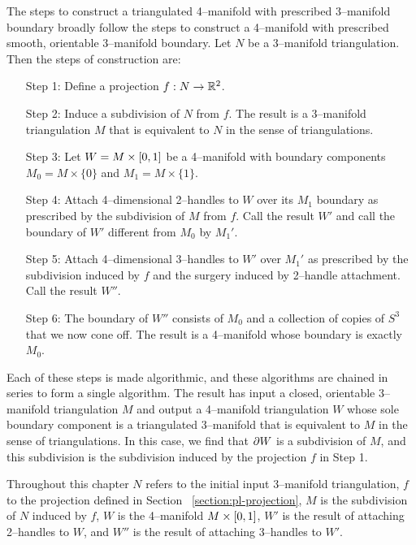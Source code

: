 \label{chapter:triangulation}

The steps to construct a triangulated 4--manifold with prescribed 3--manifold boundary broadly follow the steps to construct a 4--manifold with prescribed smooth, orientable 3--manifold boundary.
Let $N$ be a 3--manifold triangulation.
Then the steps of construction are:
\begin{enumerate}
	\item[Step 1:] Define a projection $f:N\to\mathbb{R}^2$.
	
	\item[Step 2:] Induce a subdivision of $N$ from $f$.  The result is a 3--manifold triangulation $M$ that is equivalent to $N$ in the sense of triangulations.

	\item[Step 3:] Let $W=M\times[0,1]$ be a 4--manifold with boundary components $M_0 = M\times\{0\}$ and $M_1 = M\times\{1\}$.
	
	\item[Step 4:] Attach 4--dimensional 2--handles to $W$ over its $M_1$ boundary as prescribed by the subdivision of $M$ from $f$.  Call the result $W'$ and call the boundary of $W'$ different from $M_0$ by $M_1'$.
	
	\item[Step 5:] Attach 4--dimensional 3--handles to $W'$ over $M_1'$ as prescribed by the subdivision induced by $f$ and the surgery induced by 2--handle attachment.  Call the result $W''$.
	
	\item[Step 6:] The boundary of $W''$ consists of $M_0$ and a collection of copies of $S^3$ that we now cone off.  The result is a 4--manifold whose boundary is exactly $M_0$.
\end{enumerate}

Each of these steps is made algorithmic, and these algorithms are chained in series to form a single algorithm.
The result has input a closed, orientable 3--manifold triangulation $M$ and output a 4--manifold triangulation $W$ whose sole boundary component is a triangulated 3--manifold that is equivalent to $M$ in the sense of triangulations.
In this case, we find that $\partial W$ is a subdivision of $M$, and this subdivision is the subdivision induced by the projection $f$ in Step 1.

Throughout this chapter $N$ refers to the initial input 3--manifold triangulation, $f$ to the projection defined in Section ~\ref{section:pl-projection}, $M$ is the subdivision of $N$ induced by $f$, $W$ is the 4--manifold $M\times[0,1]$, $W'$ is the result of attaching 2--handles to $W$, and $W''$ is the result of attaching 3--handles to $W'$.













